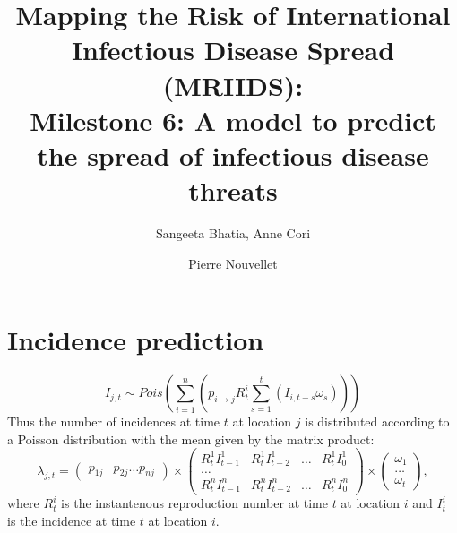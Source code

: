 \documentclass[a4paper]{article}\usepackage[]{graphicx}\usepackage[]{color}
\title{%
  Mapping the Risk of International Infectious Disease Spread (MRIIDS): \\
  \large Milestone 6: A model to predict the spread of infectious disease threats
}
\author{Sangeeta Bhatia, Anne Cori \and Pierre Nouvellet}
\begin{document}
 
\maketitle

\section{Incidence prediction}

\[
  I_{j, t} \sim \mathit{Pois}\left(\sum_{i=1}^{n}{\left(p_{i \rightarrow j}
      R_t^i \sum_{s=1}^{t} \left( I_{i, t-s} \omega_s\right) \right)} \right)
\]
Thus the number of incidences at time $t$ at location $j$ is distributed according
to a Poisson distribution with the mean given by the matrix product:
\[
  \lambda_{j, t} = 
  \begin{pmatrix}
  p_{1j} & p_{2j} \dots  p_{nj}
  \end{pmatrix} \times
  \begin{pmatrix}
   R_t^1 I_{t - 1}^1 & R_t^1 I_{t - 2}^1 & \dots & R_t^1 I_{0}^1 \\
   \dots \\
   R_t^n I_{t - 1}^n & R_t^n I_{t - 2}^n & \dots & R_t^n I_{0}^n
  \end{pmatrix}
  \times
 \begin{pmatrix}
  \omega_1 \\
  \dots \\
  \omega_t 
 \end{pmatrix},
 \]
 where $R_t^i$ is the instantenous reproduction number  at time $t$ at
 location $i$ and $I_t^i$ is the incidence at time $t$ at
 location $i$.
\end{document}
